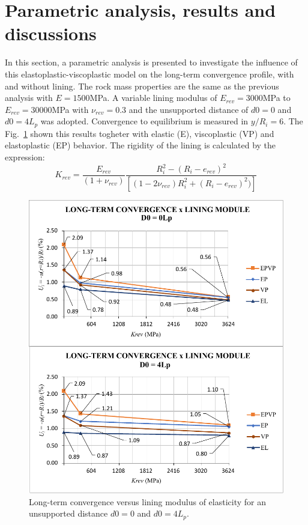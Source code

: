 \documentclass[Journal,letterpaper]{ascelike-new}
\begin{document}
\section{Parametric analysis, results and discussions}

In this section, a parametric analysis is presented to investigate the influence of this elastoplastic-viscoplastic model on the long-term convergence profile, with and without lining. The rock mass properties are the same as the previous analysis with $E=1500$MPa. A variable lining modulus of $E_{rev} = 3000$MPa to $E_{rev} = 30000$MPa with $\nu_{rev} = 0.3$ and the unsupported distance of $d0 = 0$ and $d0 = 4L_p$ was adopted. Convergence to equilibrium is measured in $y/R_i = 6$. The Fig.~\ref{convergence_lining_module} shown this results togheter with elastic (E), viscoplastic (VP) and elastoplastic (EP) behavior. The rigidity of the lining is calculated by the expression:
\begin{equation}
	\label{rigidez_revestimento}
	K_{rev} = \dfrac{E_{rev}}{(1+\nu_{rev})}\dfrac{R_i^2-(R_i-e_{rev})^2}{\left[(1-2\nu_{rev})R_i^2+(R_i-e_{rev})^2)\right]}
\end{equation}


\begin{figure}
	\centering
	\includegraphics[scale = 1.0]{convergence_lining_module.pdf}
	\caption{\label{convergence_lining_module}Long-term convergence versus lining modulus of elasticity for an unsupported distance $d0=0$ and $d0=4L_p$.}
\end{figure}
\end{document}
